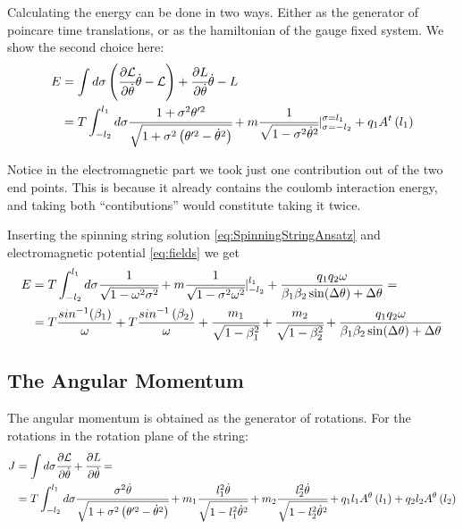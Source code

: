 \documentclass[11pt,a4paper]{article}
\begin{document}
 Calculating the energy can be done in two ways. Either as the generator of poincare time translations, or as the hamiltonian of the gauge fixed system. We show the second choice here:
\begin{align*}
E&=\int d\sigma\left(\cfrac{\partial\mathcal{L}}{\partial\dot{\theta}}\dot{\theta}-\mathcal{L}\right)+\cfrac{\partial L}{\partial\dot{\theta}}\dot{\theta}-L \\
&=T\int_{-l_{2}}^{l_{1}}d\sigma\cfrac{1+\sigma^{2}\theta'^{2}}{\sqrt{1+\sigma^{2}\left(\theta'^{2}-\dot{\theta}^{2}\right)}}+m\cfrac{1}{\sqrt{1-\sigma^{2}\dot{\theta}^{2}}}|_{\sigma=-l_{2}}^{\sigma=l_{1}}+q_{1}A^{t}\left(l_{1}\right)
\end{align*} 

Notice in the electromagnetic part we took just one contribution out of the two end points. This is because it already contains the coulomb interaction energy, and taking both “contibutions” would constitute taking it twice.

Inserting the spinning string solution \ref{eq:SpinningStringAnsatz} and electromagnetic potential \ref{eq:fields} we get
\begin{align}
E&=T\int_{-l_{2}}^{l_{1}}d\sigma\cfrac{1}{\sqrt{1-\omega^{2}\sigma^{2}}}+m\cfrac{1}{\sqrt{1-\sigma^{2}\omega^{2}}}|_{-l_{2}}^{l_{1}}+\frac{q_{1}q_{2}\omega}{\beta_{1}\beta_{2}\sin(\Delta\theta)+\Delta\theta}=\notag\\
&=T\frac{sin^{-1}(\beta_{1})}{\omega}+T\frac{sin^{-1}\left(\beta_{2}\right)}{\omega}+\cfrac{m_{1}}{\sqrt{1-\beta_{1}^{2}}}+\cfrac{m_{2}}{\sqrt{1-\beta_{2}^{2}}}+\frac{q_{1}q_{2}\omega}{\beta_{1}\beta_{2}\sin(\Delta\theta)+\Delta\theta}
\end{align} 
\FloatBarrier
 \subsection{The Angular Momentum}
 
 The angular momentum is obtained as the generator of rotations. For the rotations in the rotation plane of the string:
\begin{align*}
J&=\int d\sigma\cfrac{\partial\mathcal{L}}{\partial\dot{\theta}}+\cfrac{\partial L}{\partial\dot{\theta}}=\\
&=T\int_{-l_{2}}^{l_{1}}d\sigma\cfrac{\sigma^{2}\dot{\theta}}{\sqrt{1+\sigma^{2}\left(\theta'^{2}-\dot{\theta}^{2}\right)}}+m_{1}\cfrac{l_{1}^{2}\dot{\theta}}{\sqrt{1-l_{1}^{2}\dot{\theta}^{2}}}+m_{2}\cfrac{l_{2}^{2}\dot{\theta}}{\sqrt{1-l_{2}^{2}\dot{\theta}^{2}}}+q_{1}l_{1}A^{\theta}\left(l_{1}\right)+q_{2}l_{2}A^{\theta}\left(l_{2}\right)
\end{align*} 
\end{document}

